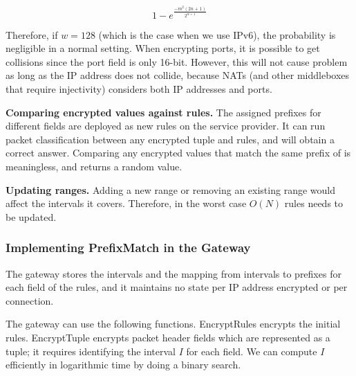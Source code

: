 \begin{equation}
1 - e^\frac{-m^2 (2n+1)}{2^{w+1}}
\end{equation}

Therefore, if $w=128$ (which is the case when we use IPv6), the probability is negligible in a normal setting. When encrypting ports, it is possible to get collisions since the port field is only 16-bit. However, this will not cause problem as long as the IP address does not collide, because NATs (and other middleboxes that require injectivity) considers both IP addresses and ports.



\noindent \textbf{Comparing encrypted values against rules.}
The assigned prefixes for different fields are deployed as new rules on the service provider. It can run packet classification between any encrypted tuple and rules, and will obtain a correct answer. Comparing any encrypted values that match the same prefix of is meaningless, and returns a random value.

\noindent \textbf{Updating ranges.}
Adding a new range or removing an existing range would affect the intervals it covers. Therefore, in the worst case $O(N)$ rules needs to be updated. 

\subsubsection{Implementing PrefixMatch in the Gateway}
\label{sec:tree}

The gateway stores the intervals and the mapping from intervals to prefixes for each field of the rules, and it maintains no state per IP address encrypted or per connection.

The gateway can use the following functions. EncryptRules encrypts the initial rules. EncryptTuple encrypts packet header fields which are represented as a tuple; it requires identifying the interval $I$ for each field. We can compute $I$ efficiently in logarithmic time by doing a binary search. 

